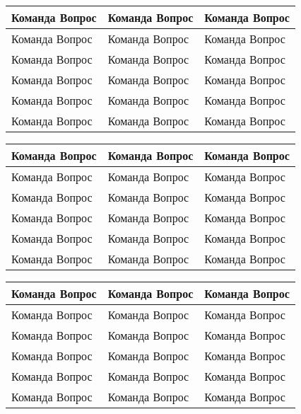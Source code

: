 
\usepackage{multicol}
\usepackage{tabularx}
\newdimen{\blankheight}
\newdimen{\blankwidth}
\newcommand{\cell}{\vspace{0.3em}\hspace{2em} Команда \makebox[2em]{\hrulefill}\hspace{\blankwidth} Вопрос \arabic{Questions}\stepcounter{Questions} \vspace{\blankheight}}

\begin{tabularx}{\textwidth}{>{\raggedright\arraybackslash}X|>{\raggedright\arraybackslash}X|>{\raggedright\arraybackslash}X}
\cell & \cell & \cell \\ \hline
\cell & \cell & \cell \\ \hline
\cell & \cell & \cell \\ \hline
\cell & \cell & \cell \\ \hline
\cell & \cell & \cell \\ \hline
\cell & \cell & \cell \\ \hline

\end{tabularx}
\clearpage
\begin{tabularx}{\textwidth}{>{\raggedright\arraybackslash}X|>{\raggedright\arraybackslash}X|>{\raggedright\arraybackslash}X}
\cell & \cell & \cell \\ \hline
\cell & \cell & \cell \\ \hline
\cell & \cell & \cell \\ \hline
\cell & \cell & \cell \\ \hline
\cell & \cell & \cell \\ \hline
\cell & \cell & \cell \\ \hline

\end{tabularx}
\clearpage
\begin{tabularx}{\textwidth}{>{\raggedright\arraybackslash}X|>{\raggedright\arraybackslash}X|>{\raggedright\arraybackslash}X}
\cell & \cell & \cell \\ \hline
\cell & \cell & \cell \\ \hline
\cell & \cell & \cell \\ \hline
\cell & \cell & \cell \\ \hline
\cell & \cell & \cell \\ \hline
\cell & \cell & \cell \\ \hline

\end{tabularx}
